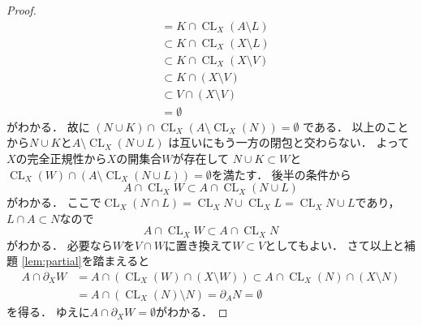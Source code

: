 \documentclass[leqno, a4paper, 12pt]{jsarticle}
\DeclareMathOperator{\cl}{CL}
\numberwithin{equation}{section}
\begin{document}
\begin{proof}
\begin{align*}
&=
K\cap \cl_{X}(A\setminus L)\\
&\subset K\cap \cl_{X}(X\setminus L)\\
&\subset K\cap \cl_{X}(X\setminus V)\\
&\subset K\cap (X\setminus V)\\
&\subset V\cap (X\setminus V)\\
&=\emptyset
\end{align*}
がわかる．
故に
$(N\cup K)\cap \cl_{X}(A\setminus \cl_{X}(N))=\emptyset$
である．
以上のことから$N\cup K$と$A\setminus \cl_{X}(N\cup L)$
は互いにもう一方の閉包と交わらない．
よって$X$の完全正規性から$X$の開集合$W$が存在して
$N\cup K\subset W$と
$\cl_{X}(W)\cap (A\setminus \cl_{X}(N\cup L))=\emptyset$を満たす．
後半の条件から
\[
A\cap \cl_{X}W\subset A\cap \cl_{X}(N\cup L)
\]がわかる．
ここで$\cl_{X}(N\cap L)=\cl_{X}N\cup \cl_{X}L=\cl_{X}N\cup L$であり，$L\cap A\subset N$なので
\[
A\cap \cl_{X}W\subset A\cap \cl_{X}N
\]
がわかる．
必要なら$W$を$V\cap W$に置き換えて$W\subset V$としてもよい．
さて以上と補題 \ref{lem:partial}を踏まえると
\begin{align*}
A\cap 
\partial_{X} W
&=
A\cap (\cl_{X}(W)\cap (X\setminus W))
\subset 
A\cap \cl_{X}(N)\cap (X\setminus N)
\\
&=A\cap (\cl_{X}(N)\setminus N)
=\partial_{A}N=\emptyset
\end{align*}
を得る．
ゆえに$A\cap \partial_{X} W=\emptyset$がわかる．
\end{proof}
\end{document}
